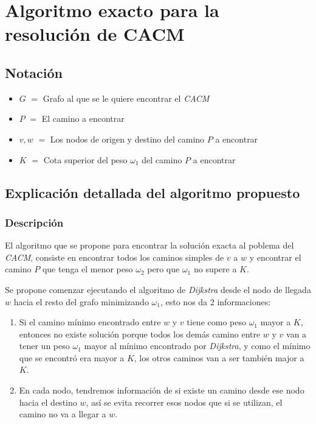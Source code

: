 \section{Algoritmo exacto para la resoluci\'on de CACM}

\subsection{Notaci\'on} \label{exacto:notacion}

\begin{itemize}
	\item $G$ $=$ Grafo al que se le quiere encontrar el \emph{CACM}
	\item $P$ $=$ El camino a encontrar
	\item $v, w$ $=$ Los nodos de origen y destino del camino $P$ a encontrar
	\item $K$ $=$ Cota superior del peso $\omega_1$ del camino $P$ a encontrar
\end{itemize}

\subsection{Explicaci\'on detallada del algoritmo propuesto} \label{exacto:explicacion}

\subsubsection{Descripci\'on}

El algoritmo que se propone para encontrar la soluci\'on exacta al poblema del \emph{CACM}, consiste en encontrar todos los caminos simples de $v$ a $w$
y encontrar el camino $P$ que tenga el menor peso $\omega_2$ pero que $\omega_1$ no supere a $K$.

Se propone comenzar ejecutando el algoritmo de \emph{Dijkstra} desde el nodo de llegada $w$ hacia el resto del grafo minimizando $\omega_1$, esto nos da 2 informaciones:
\begin{enumerate}
	\item Si el camino m\'inimo encontrado entre $w$ y $v$ tiene como peso $\omega_1$ mayor a $K$,
entonces no existe soluci\'on porque todos los dem\'as camino entre $w$ y $v$ van a tener un peso $\omega_1$ mayor al m\'inimo encontrado por \emph{Dijkstra},
y como el m\'inimo que se encontr\'o era mayor a $K$, los otros caminos van a ser tambi\'en major a $K$.
	\item En cada nodo, tendremos informaci\'on de si existe un camino desde ese nodo hacia el destino $w$, as\'i se evita recorrer esos nodos que si se utilizan, el camino no va a llegar a $w$.
\end{enumerate}

